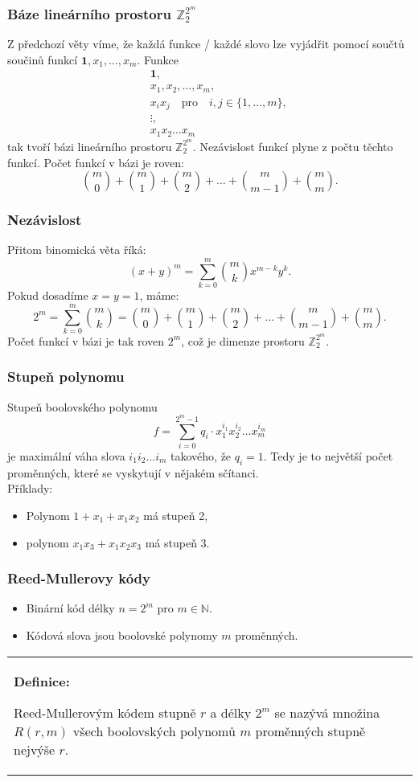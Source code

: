 \documentclass{beamer}
\newenvironment{definice}
{
    \begin{center}
    \begin{tabular}{p{9cm}}
    \textbf{Definice:}
}
{
    \end{tabular}
    \end{center}
}
\newcommand{\cela}{\mathbb{Z}}
\newcommand{\one}{\textbf{1}}
\newcommand{\emptyline}{\\$\,$\\}
\newenvironment{itemizex}%
  {\large \begin{itemize}%
    \setlength{\itemsep}{8pt}%
    \setlength{\parskip}{8pt}}%
  {\end{itemize}}
\begin{document}
\begin{frame}[t,fragile]\frametitle{Báze lineárního prostoru $\cela_2^{2^m}$} 
    Z předchozí věty víme, že každá funkce / každé slovo lze vyjádřit pomocí součtů součinů funkcí $\one, x_1,\dots, x_m$. Funkce
    \begin{eqnarray*}
    &&\one,\\
    &&x_1,x_2,\dots,x_m,\\
    &&x_ix_j\quad\mbox{pro}\quad i,j\in\{1,\dots,m\},\\
    &&\vdots,\\
    &&x_1x_2\dots x_m
    \end{eqnarray*}
    tak tvoří bázi lineárního prostoru $\cela_2^{2^m}$. Nezávislost funkcí plyne z počtu těchto funkcí. Počet funkcí v bázi je roven:
$$
{m\choose0}+{m\choose1}+{m\choose2}+\dots+{m\choose m-1}+{m\choose m}.
$$

\end{frame}

\begin{frame}[t,fragile]\frametitle{Nezávislost} 
Přitom binomická věta říká:
    $$
(x+y)^m=\sum_{k=0}^{m}{m\choose k}x^{m-k}y^k.
    $$
Pokud dosadíme $x=y=1$, máme:
$$
2^m=\sum_{k=0}^{m}{m\choose k}={m\choose0}+{m\choose1}+{m\choose2}+\dots+{m\choose m-1}+{m\choose m}.
$$
Počet funkcí v bázi je tak roven $2^m$, což je dimenze prostoru $\cela_2^{2^m}$.
\end{frame}


\begin{frame}[t,fragile]\frametitle{Stupeň polynomu} 
    Stupeň boolovského polynomu
        $$
        f = \sum_{i=0}^{2^{m}-1}q_i\cdot x_1^{i_1}x_2^{i_2}\dots x_m^{i_m}
        $$
        je maximální váha slova $i_1i_2\dots i_m$ takového, že $q_i=1$. Tedy je to největší počet proměnných, které se vyskytují v nějakém sčítanci. 
\emptyline
        Příklady:
        \begin{itemizex}
            \item Polynom $1+x_1+x_1x_2$ má stupeň 2,
            \item polynom $x_1x_3+x_1x_2x_3$ má stupeň 3.
        \end{itemizex}
\end{frame}


\begin{frame}[t,fragile]\frametitle{Reed-Mullerovy kódy}
    \begin{itemizex}
        \item Binární kód délky $n=2^m$ pro $m\in\mathbb{N}$.
        \item Kódová slova jsou boolovské polynomy $m$ proměnných.
    \end{itemizex}

    \begin{definice}
    Reed-Mullerovým kódem stupně $r$ a délky $2^m$ se nazývá množina $R(r,m)$ všech boolovských polynomů $m$ proměnných stupně nejvýše $r$.
    \end{definice}
\end{frame}
\end{document}
